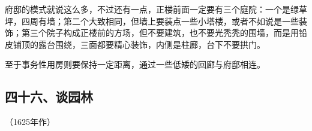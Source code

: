 \par 府邸的模式就说这么多，不过还有一点，正楼前面一定要有三个庭院：一个是绿草坪，四周有墙；第二个大致相同，但墙上要装点一些小塔楼，或者不如说是一些装饰；第三个院子构成正楼前的方场，但不要建筑，也不要光秃秃的围墙，而是用铅皮铺顶的露台围绕，三面都要精心装饰，内侧是柱廊，台下不要拱门。
\par 至于事务性用房则要保持一定距离，通过一些低矮的回廊与府邸相连。




\subsection*{四十六、谈园林}
\begin{center}
    （1625年作）
\end{center}

